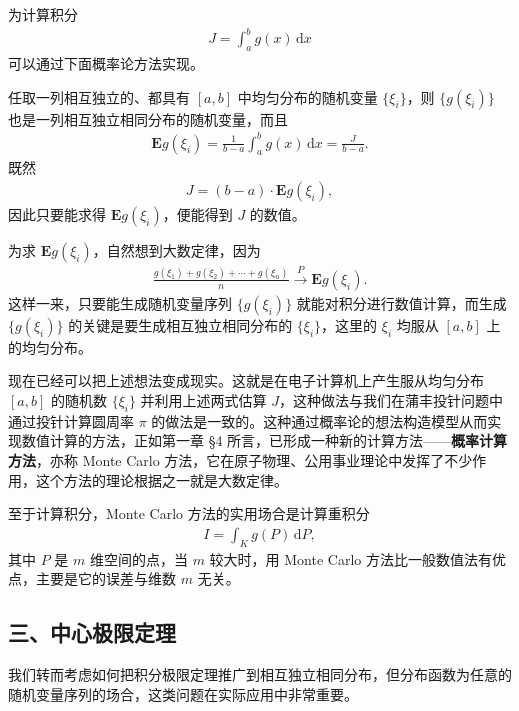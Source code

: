 \documentclass[../../main.tex]{subfiles}
\begin{document}
\begin{example}\label{example:ch05-MonteCarlo定积分}
为计算积分
\begin{align}
J=\int_{a}^{b}g(x)\,\mathrm{d}x
\end{align}
可以通过下面概率论方法实现。

任取一列相互独立的、都具有 $[a,b]$ 中均匀分布的随机变量 $\{\xi_i\}$，则 $\{g(\xi_i)\}$ 也是一列相互独立相同分布的随机变量，而且
\begin{align*}
\boldsymbol{E}g(\xi_i)=\frac{1}{b-a}\int_{a}^{b}g(x)\,\mathrm{d}x=\frac{J}{b-a}.
\end{align*}
既然
\begin{align}
J=(b-a)\cdot\boldsymbol{E}g(\xi_i),
\end{align}
因此只要能求得 $\boldsymbol{E}g(\xi_i)$，便能得到 $J$ 的数值。

为求 $\boldsymbol{E}g(\xi_i)$，自然想到大数定律，因为
\begin{align}
\frac{g(\xi_1)+g(\xi_2)+\cdots+g(\xi_n)}{n}\xrightarrow{P}\boldsymbol{E}g(\xi_i).
\end{align}
这样一来，只要能生成随机变量序列 $\{g(\xi_i)\}$ 就能对积分进行数值计算，而生成 $\{g(\xi_i)\}$ 的关键是要生成相互独立相同分布的 $\{\xi_i\}$，这里的 $\xi_i$ 均服从 $[a,b]$ 上的均匀分布。

现在已经可以把上述想法变成现实。这就是在电子计算机上产生服从均匀分布 $[a,b]$ 的随机数 $\{\xi_i\}$ 并利用上述两式估算 $J$，这种做法与我们在蒲丰投针问题中通过投针计算圆周率 $\pi$ 的做法是一致的。这种通过概率论的想法构造模型从而实现数值计算的方法，正如第一章 \S4 所言，已形成一种新的计算方法——\textbf{概率计算方法}，亦称 Monte Carlo 方法，它在原子物理、公用事业理论中发挥了不少作用，这个方法的理论根据之一就是大数定律。

至于计算积分，Monte Carlo 方法的实用场合是计算重积分
\begin{align}
I=\int_{K}g(P)\,\mathrm{d}P,
\end{align}
其中 $P$ 是 $m$ 维空间的点，当 $m$ 较大时，用 Monte Carlo 方法比一般数值法有优点，主要是它的误差与维数 $m$ 无关。
\end{example}

\subsection*{三、中心极限定理}

我们转而考虑如何把积分极限定理推广到相互独立相同分布，但分布函数为任意的随机变量序列的场合，这类问题在实际应用中非常重要。
\end{document}

